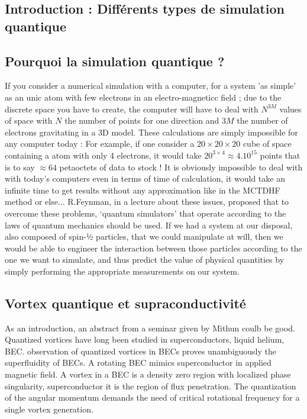 \documentclass[a4paper]{article}
\begin{document}
\begin{multicols}{2}


\section{Introduction : Différents types de simulation quantique} 
\subsection*{Pourquoi la simulation quantique ?}

If you consider a numerical simulation with a computer, for a system 'as simple' as an unic atom with few electrons in an electro-magneticc field ; due to the discrete space you have to create, the computer will have to deal with $N^{3M}$ values of space with $N$ the number of points for one direction and $3M$ the number of electrons gravitating in a 3D model. These calculations are simply impossible for any computer today : For example, if one consider a $20 \times 20 \times 20$ cube of space containing a atom with only 4 electrons, it would take $20^{3 \times 4} \approx 4.10^{15}$ points that is to say $\approx 64$ petaoctets of data to stock !  It is obviously impossible to deal with with today's computers even in terms of time of calculation, it would take an infinite time to get results without any approximation like in the MCTDHF method or else... %
R.Feynman, in a lecture about these issues, proposed that to overcome these problems, ‘quantum simulators’ that operate according to the laws of quantum mechanics should be used. If we had a system at our disposal, also composed of spin-½ particles, that we could manipulate at will, then we would be able to engineer the interaction between those particles according to the one we want to simulate, and thus predict the value of physical quantities by simply performing the appropriate measurements on our system. %

\subsection*{Vortex quantique et supraconductivité}
As an introduction, an abstract from a seminar given by Mithun coulb be good. Quantized vortices have long been studied in superconductors, liquid helium, BEC. observation of quantized vortices in BECs proves unambiguously the superfluidity of BECs. A rotating BEC mimics superconductor in applied magnetic field. A vortex in a BEC is a density zero region with localized phase singularity, superconductor it is the region of flux penetration. The quantization of the angular momentum demands the need of critical rotational frequency for a single vortex generation.



\end{multicols}
\end{document}
